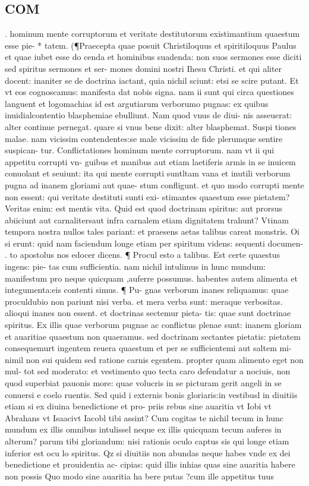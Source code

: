\documentclass{article}
\begin{document}
\begin{pages}
\section*{COM }
\marginpar{[ p.6 ]}\pstart . hominum mente corruptorum et veritate destitutorum existimantium quaestum esse pie- * tatem. (¶Praecepta quae posuit Christiloquus et spiritiloquus Paulus et quae iubet esse do cenda et hominibus suadenda: non suos sermones esse diciti sed spiritus sermones et ser- mones domini nostri Ihesu Christi. et qui aliter docent: inaniter se de doctrina iactant, quia nichil sciunt: etsi se scire putant. Et vt eos cognoscamus: manifesta dat nobis signa. nam ii sunt qui circa questiones languent et logomachias id est argutiarum verborumo pugnas: ex quibus inuidialcontentio blasphemiae ebulliunt. Nam quod vnus de diui- nis asseuerat: alter continue pernegat. quare si vnus bene dixit: alter blasphemat. Suspi tiones malae. nam vicissim contendentes:se male vicissim de fide plerumque sentire suspican- tur. Conflictationes hominum mente corruptorum. nam vt ii qui appetitu corrupti vn- guibus et manibus aut etiam laetiferis armis in se inuicem conuolant et seuiunt: ita qui mente corrupti suntltam vana et inutili verborum pugna ad inanem gloriami aut quae- stum confligunt. et quo modo corrupti mente non essent: qui veritate destituti sunti exi- stimantes quaestum esse pietatem? Veritas enim: est mentis vita. Quid est quod doctrinam spiritus: aut prorsus abiiciunt aut carnalitersaut infra carnalem etiam dignitatem trahunt? Vtinam tempora nostra nullos tales pariant: et praesens aetas talibus careat monstris. Oi si erunt: quid nam faciendum longe etiam per spiritum videns: sequenti documen- . to apostolus nos edocer dicens. ¶ Procul esto a talibus. Est certe quaestus ingens: pie-  tas cum sufficientia. nam nichil intulimus in hunc mundum: manifestum pro neque quicquam ,auferre possumus. habentes autem alimenta et integumenta:eis contenti simus. ¶ Pu- gnas verborum inanes reliquamus: quae proculdubio non pariunt nisi verba. et mera verba sunt: meraque verbositas. alioqui inanes non essent. et doctrinas sectemur pieta- tis: quae sunt doctrinae spiritus. Ex illis quae verborum pugnae ac conflictus plenae sunt: inanem gloriam et auaritiae quaestum non quaeramus. sed doctrinam sectantes pietatis: pietatem consequemurt ingentem reuera quaestum et per se sufficientemi aut saltem mi- nimil non sui quidem sed ratione carnis egentem. propter quam alimento eget non mul- tot sed moderato: et vestimento quo tecta caro defendatur a nociuis, non quod superbiat pauonis more: quae volucris in se picturam gerit angeli in se conuersi e coelo ruentis. Sed quid i externis bonis gloriaris:in vestibusl in diuitiis etiam si ex diuina benedictione et pro- priis rebus sine auaritia vt Iobi vt Abrahans vt Isaacivt Iacobl tibi assint? Cum cogitas te nichil tecum in hunc mundum ex illis omnibus intulissel neque ex illis quicquam tecum auferes in alterum? parum tibi gloriandum: nisi rationis oculo captus sis qui longe etiam inferior est ocu lo spiritus. Qz si diuitiis non abundas neque habes vnde ex dei benedictione et prouidentia ac- cipias: quid illis inhias quas sine auaritia habere non possis Quo modo sine auaritia ha bere putas ?cum ille appetitus tuus 
\end{pages}
\end{document}
